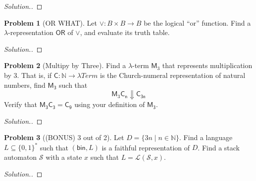 \documentclass[11pt]{article}
\theoremstyle{theorem} %
\theoremstyle{definition} %
\newtheorem{problem}                    {{\color{BurntOrange}Problem}}
\theoremstyle{remark} %
\begin{document}
\begin{proof}
    [Solution.]
\end{proof}

\begin{problem}
    [OR WHAT]
    Let \(\vee \colon B \times B \to B\) be the logical ``or'' function. 
    Find a \(\lambda\)-representation \(\mathsf{OR}\) of \(\vee\), and evaluate its truth table.
\end{problem}

\begin{proof}
    [Solution.]
\end{proof}

\begin{problem}
    [Multipy by Three]
    Find a \(\lambda\)-term \(\mathsf{M}_3\) that represents multiplication by \(3\). 
    That is, if \(\mathsf{C} \colon \mathbb N \to \lambda\mathit{Term}\) is the Church-numeral representation of natural numbers, find \(\mathsf{M_3}\) such that 
    \[
        \mathsf{M}_3\mathsf{C_n} \Downarrow \mathsf{C_{3n}}
    \]
    Verify that \(\mathsf{M_3} \mathsf{C_3} = \mathsf{C_9}\) using your definition of \(\mathsf{M_3}\).
\end{problem}

\begin{proof}
    [Solution.]
\end{proof}

\begin{problem}
    [(BONUS) 3 out of 2]
    Let \(D = \{3n \mid n \in \mathbb N\}\).
    Find a language \(L \subseteq \{0,1\}^*\) such that \((\mathsf{bin}, L)\) is a faithful representation of \(D\).
    Find a stack automaton \(\mathcal S\) with a state \(x\) such that \(L = \mathcal L(\mathcal S, x)\).
\end{problem}


\begin{proof}
    [Solution.]
\end{proof}
\end{document}
